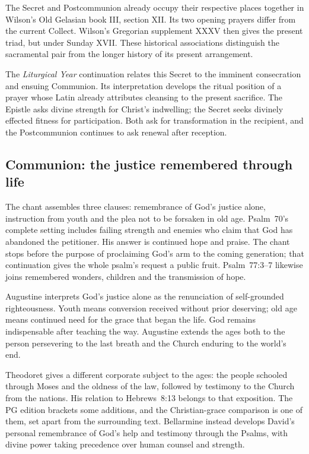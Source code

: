 The Secret and Postcommunion already occupy their respective places together in Wilson's Old Gelasian book III, section XII. Its two opening prayers differ from the current Collect. Wilson's Gregorian supplement XXXV then gives the present triad, but under Sunday XVII. These historical associations distinguish the sacramental pair from the longer history of its present arrangement. 

The \textit{Liturgical Year} continuation relates this Secret to the imminent consecration and ensuing Communion. Its interpretation develops the ritual position of a prayer whose Latin already attributes cleansing to the present sacrifice. The Epistle asks divine strength for Christ's indwelling; the Secret seeks divinely effected fitness for participation. Both ask for transformation in the recipient, and the Postcommunion continues to ask renewal after reception. 

\subsection*{Communion: the justice remembered through life}
The chant assembles three clauses: remembrance of God's justice alone, instruction from youth and the plea not to be forsaken in old age. Psalm~70's complete setting includes failing strength and enemies who claim that God has abandoned the petitioner. His answer is continued hope and praise. The chant stops before the purpose of proclaiming God's arm to the coming generation; that continuation gives the whole psalm's request a public fruit. Psalm~77:3--7 likewise joins remembered wonders, children and the transmission of hope.

Augustine interprets God's justice alone as the renunciation of self-grounded righteousness. Youth means conversion received without prior deserving; old age means continued need for the grace that began the life. God remains indispensable after teaching the way. Augustine extends the ages both to the person persevering to the last breath and the Church enduring to the world's end. 

Theodoret gives a different corporate subject to the ages: the people schooled through Moses and the oldness of the law, followed by testimony to the Church from the nations. His relation to Hebrews~8:13 belongs to that exposition. The PG edition brackets some additions, and the Christian-grace comparison is one of them, set apart from the surrounding text. Bellarmine instead develops David's personal remembrance of God's help and testimony through the Psalms, with divine power taking precedence over human counsel and strength. 

